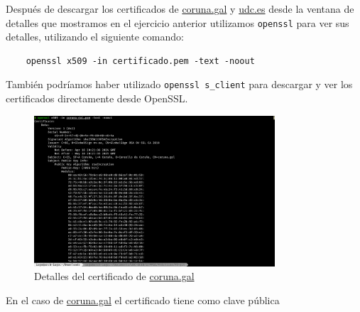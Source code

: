 Después de descargar los certificados de \url{coruna.gal} y \url{udc.es} desde la ventana de detalles que mostramos en el ejercicio anterior utilizamos \texttt{openssl} para ver sus detalles, utilizando el siguiente comando:

\begin{verbatim}
    openssl x509 -in certificado.pem -text -noout
\end{verbatim}

También podríamos haber utilizado \texttt{openssl s\_client} para descargar y ver los certificados directamente desde OpenSSL.

\begin{figure}[H]
    \centering
    \includegraphics[width=0.8\textwidth]{openssl-coruna.png}
    \caption{Detalles del certificado de \url{coruna.gal}}
\end{figure}

En el caso de \url{coruna.gal} el certificado tiene como clave pública

